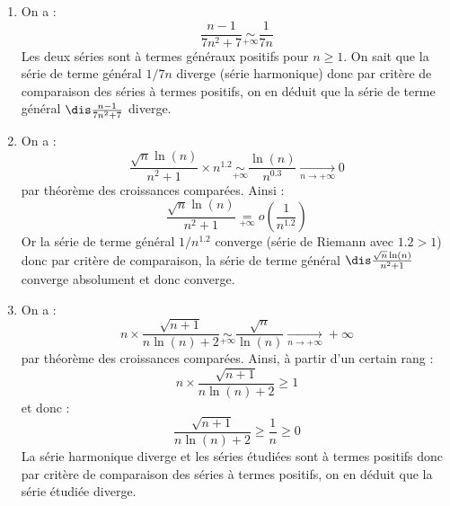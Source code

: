 \documentclass[a4paper,twoside,french,10pt]{VcCours}
\begin{document}
\begin{enumerate}
\item On a :
$$ \frac{n-1}{7n^2+7} \underset{+ \infty}{\sim} \frac{1}{7n}$$
Les deux séries sont à termes généraux positifs pour $n \geq 1$. On sait que la série de terme général $1/7n$ diverge (série harmonique) donc par critère de comparaison des séries à termes positifs, on en déduit que la série de terme général $ \dis\frac{n-1}{7n^2+7}$ diverge.
\item On a :
$$ \frac{\sqrt{n}\ln(n)}{n^2+1} \times n^{1.2} \underset{+ \infty}{\sim}  \frac{\ln(n)}{n^{0.3}} \underset{n \rightarrow + \infty}{\longrightarrow} 0$$
par théorème des croissances comparées. Ainsi :
$$ \frac{\sqrt{n}\ln(n)}{n^2+1} \underset{+\infty}{=} o \left( \frac{1}{n^{1.2}} \right)$$
Or la série de terme général $1/n^{1.2}$ converge (série de Riemann avec $1.2 >1$) donc par critère de comparaison, la série de terme général $\dis\frac{\sqrt{n}\ln(n)}{n^2+1}$ converge absolument et donc converge.
\item On a :
$$ n \times \frac{\sqrt{n+1}}{n\ln(n)+2} \underset{+ \infty}{\sim} \dfrac{\sqrt{n}}{\ln(n)}\underset{n \rightarrow + \infty}{\longrightarrow} + \infty$$
par théorème des croissances comparées. Ainsi, à partir d'un certain rang :
$$ n \times \frac{\sqrt{n+1}}{n\ln(n)+2} \geq 1$$
et donc :
$$ \frac{\sqrt{n+1}}{n\ln(n)+2} \geq \dfrac{1}{n} \geq 0$$
La série harmonique diverge et les séries étudiées sont à termes positifs donc par critère de comparaison des séries à termes positifs, on en déduit que la série étudiée diverge.


\end{enumerate}
\end{document}
